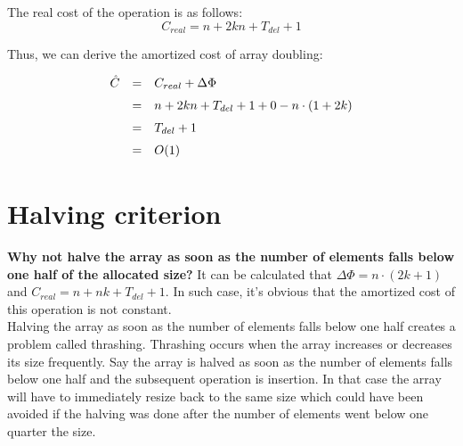   The real cost of the operation is as follows:
  \[
  C_{real} = n + 2kn + T_{del} + 1
  \]

  Thus, we can derive the amortized cost of array doubling:
  \[
  \def\arraystretch{1.5}
  \begin{array}{lcl}
  \hat C & = & C_{real} + \Delta \Phi \\
         & = & n + 2kn + T_{del} + 1 + 0 - n \cdot (1 + 2k) \\
         & = & T_{del} + 1 \\
         & = & O(1)
  \end{array}
  \]

\section{Halving criterion}
  \textbf{Why not halve the array as soon as the number of elements falls below one half of the allocated size?}
  It can be calculated that $\Delta \Phi = n \cdot (2k + 1)$ and $C_{real} = n + nk + T_{del} + 1$. In such case, it's obvious that the amortized cost of this operation is not constant. \\ 
  Halving the array as soon as the number of elements falls below one half creates a problem called thrashing. Thrashing occurs when the array increases or decreases its size frequently. Say the array is halved as soon as the number of elements falls below one half and the subsequent operation is insertion. In that case the array will have to immediately resize back to the same size which could have been avoided if the halving was done after the number of elements went below one quarter the size.

